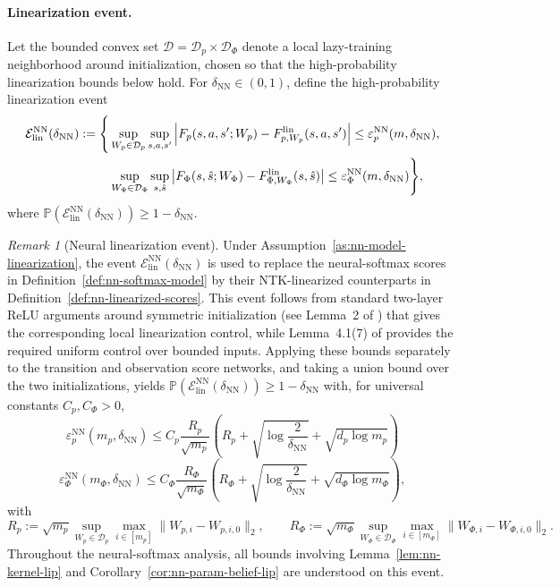 \documentclass[10pt]{article} %
\theoremstyle{plain}
\theoremstyle{definition}
\theoremstyle{remark}
\newtheorem{remark}[theorem]{Remark}
\newcommand{\bP}{\mathbb{P}}
\begin{document}
\paragraph{Linearization event.} Let the bounded convex set \(\mathcal D=\mathcal D_p\times\mathcal D_\Phi\) denote a local lazy-training neighborhood around initialization, chosen so that the high-probability linearization bounds below hold. For \(\delta_{\mathrm{NN}}\in(0,1)\), define the high-probability linearization event
\begin{align}
\mathcal E_{\mathrm{lin}}^{\mathrm{NN}}(\delta_{\mathrm{NN}})
:=\Bigg\{&\sup_{W_p\in\mathcal D_p}\sup_{s,a,s'}
\left|F_p(s,a,s';W_p)-F_{p,W_p}^{\mathrm{lin}}(s,a,s')\right|
\le \varepsilon_p^{\mathrm{NN}}(m,\delta_{\mathrm{NN}}), \notag\\
&\sup_{W_\Phi\in\mathcal D_\Phi}\sup_{s,\hat s} \left|F_\Phi(s,\hat s;W_\Phi)-F_{\Phi,W_\Phi}^{\mathrm{lin}}(s,\hat s)\right| \le \varepsilon_\Phi^{\mathrm{NN}}(m,\delta_{\mathrm{NN}})
\Bigg\},\label{eq:nn-linearization-event}
\end{align}
where \(\bP(\mathcal E_{\mathrm{lin}}^{\mathrm{NN}}(\delta_{\mathrm{NN}}))\ge 1-\delta_{\mathrm{NN}}\).



\medskip
\medskip




\begin{remark}[Neural linearization event]\label{rem:nn-linearization-event}
Under Assumption~\ref{as:nn-model-linearization}, the event $\mathcal E_{\mathrm{lin}}^{\mathrm{NN}}(\delta_{\mathrm{NN}})$ is used to replace the neural-softmax scores in Definition~\ref{def:nn-softmax-model} by their NTK-linearized counterparts in Definition~\ref{def:nn-linearized-scores}. This event follows from standard two-layer ReLU arguments around symmetric initialization (see Lemma~2 of \citet{cayci2022finite}) that gives the corresponding local linearization control, while Lemma~4.1(7) of \citet{satpathi2020role} provides the required uniform control over bounded inputs. Applying these bounds separately to the transition and observation score networks, and taking a union bound over the two initializations, yields $\bP(\mathcal E_{\mathrm{lin}}^{\mathrm{NN}}(\delta_{\mathrm{NN}}))\ge 1-\delta_{\mathrm{NN}}$ with, for universal constants $C_p,C_\Phi>0$,
\[
\varepsilon_p^{\mathrm{NN}}(m_p,\delta_{\mathrm{NN}})\le
C_p\frac{R_p}{\sqrt{m_p}}\left(R_p+\sqrt{\log\frac{2}{\delta_{\mathrm{NN}}}}+\sqrt{d_p\log m_p}\right)\]
\[
\varepsilon_\Phi^{\mathrm{NN}}(m_\Phi,\delta_{\mathrm{NN}})\le C_\Phi\frac{R_\Phi}{\sqrt{m_\Phi}} \left(R_\Phi+\sqrt{\log\frac{2}{\delta_{\mathrm{NN}}}}+\sqrt{d_\Phi\log m_\Phi}\right),
\]
with
\[
R_p:=\sqrt{m_p}\sup_{W_p\in\mathcal D_p}\max_{i\in[m_p]}\|W_{p,i}-W_{p,i,0}\|_2, \qquad R_\Phi:=\sqrt{m_\Phi}\sup_{W_\Phi\in\mathcal D_\Phi}\max_{i\in[m_\Phi]}\|W_{\Phi,i}-W_{\Phi,i,0}\|_2 .
\]
 Throughout the neural-softmax analysis, all bounds involving Lemma~\ref{lem:nn-kernel-lip} and Corollary~\ref{cor:nn-param-belief-lip} are understood on this event.
\end{remark}
\end{document}

